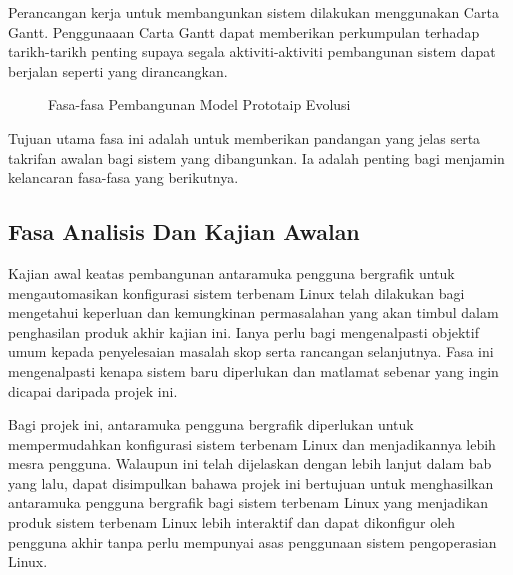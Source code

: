 Perancangan kerja untuk membangunkan sistem dilakukan menggunakan Carta Gantt. Penggunaaan Carta Gantt dapat memberikan perkumpulan terhadap tarikh-tarikh penting supaya segala aktiviti-aktiviti pembangunan sistem dapat berjalan seperti yang dirancangkan.

\begin{figure}[!h]
\caption[Fasa-fasa Pembangunan Model Prototaip Evolusi]{Fasa-fasa Pembangunan Model Prototaip Evolusi}
\label{c3:f2}
\end{figure}

Tujuan utama fasa ini adalah untuk memberikan pandangan yang jelas serta takrifan awalan bagi sistem yang dibangunkan. Ia adalah penting bagi menjamin kelancaran fasa-fasa yang berikutnya.

\subsection{Fasa Analisis Dan Kajian Awalan}
Kajian awal keatas pembangunan antaramuka pengguna bergrafik untuk mengautomasikan konfigurasi sistem terbenam Linux telah dilakukan bagi mengetahui keperluan dan kemungkinan permasalahan yang akan timbul dalam penghasilan produk akhir kajian ini. Ianya perlu bagi mengenalpasti objektif umum kepada penyelesaian masalah skop serta rancangan selanjutnya. Fasa ini mengenalpasti kenapa sistem baru diperlukan dan matlamat sebenar yang ingin dicapai daripada projek ini.

Bagi projek ini, antaramuka pengguna bergrafik diperlukan untuk mempermudahkan konfigurasi sistem terbenam Linux dan menjadikannya lebih mesra pengguna. Walaupun ini telah dijelaskan dengan lebih lanjut dalam bab yang lalu, dapat disimpulkan bahawa projek ini bertujuan untuk menghasilkan antaramuka pengguna bergrafik bagi sistem terbenam Linux yang menjadikan produk sistem terbenam Linux lebih interaktif dan dapat dikonfigur oleh pengguna akhir tanpa perlu mempunyai asas penggunaan sistem pengoperasian Linux.

